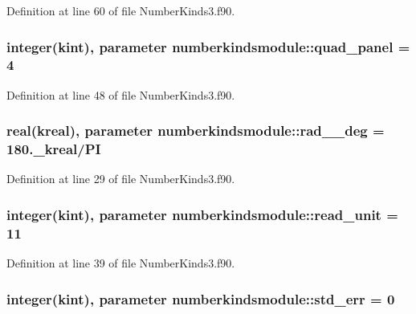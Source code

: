 Definition at line 60 of file Number\+Kinds3.\+f90.

\hypertarget{classnumberkindsmodule_ab3062c50a0b035fca7077f04a8e49329}{
\subsubsection[{quad\+\_\+panel}]{\setlength{\rightskip}{0pt plus 5cm}integer({\bf kint}), parameter numberkindsmodule\+::quad\+\_\+panel = 4}}\label{classnumberkindsmodule_ab3062c50a0b035fca7077f04a8e49329}


Definition at line 48 of file Number\+Kinds3.\+f90.

\hypertarget{classnumberkindsmodule_aadb33c76ca6311bf704590f5fe6fcb03}{
\subsubsection[{rad\+\_\+2\+\_\+deg}]{\setlength{\rightskip}{0pt plus 5cm}real({\bf kreal}), parameter numberkindsmodule\+::rad\+\_\+\_\+deg = 180.\+\_\+kreal/\+P\+I}}\label{classnumberkindsmodule_aadb33c76ca6311bf704590f5fe6fcb03}


Definition at line 29 of file Number\+Kinds3.\+f90.

\hypertarget{classnumberkindsmodule_ae275628322d1dedf50a022f740d88e22}{
\subsubsection[{read\+\_\+unit}]{\setlength{\rightskip}{0pt plus 5cm}integer({\bf kint}), parameter numberkindsmodule\+::read\+\_\+unit = 11}}\label{classnumberkindsmodule_ae275628322d1dedf50a022f740d88e22}


Definition at line 39 of file Number\+Kinds3.\+f90.

\hypertarget{classnumberkindsmodule_aae6e3183138e223eec9e8f3d8d123bba}{
\subsubsection[{std\+\_\+err}]{\setlength{\rightskip}{0pt plus 5cm}integer({\bf kint}), parameter numberkindsmodule\+::std\+\_\+err = 0}}\label{classnumberkindsmodule_aae6e3183138e223eec9e8f3d8d123bba}


